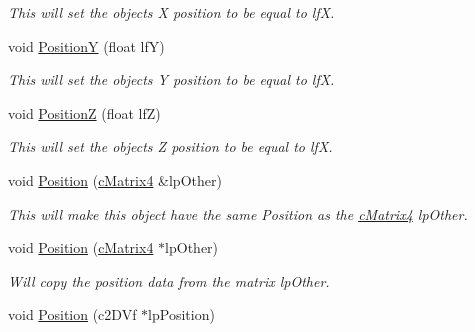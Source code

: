 \begin{DoxyCompactItemize}
\begin{DoxyCompactList}\small\item\em This will set the objects X position to be equal to lfX. \end{DoxyCompactList}\item 
\hypertarget{classc_matrix4_a4f7469486d7557e158ebc70a261c853c}{
void \hyperlink{classc_matrix4_a4f7469486d7557e158ebc70a261c853c}{PositionY} (float lfY)}
\label{classc_matrix4_a4f7469486d7557e158ebc70a261c853c}

\begin{DoxyCompactList}\small\item\em This will set the objects Y position to be equal to lfX. \end{DoxyCompactList}\item 
\hypertarget{classc_matrix4_a6baf253feb5e27b5e3e81971d9f5d718}{
void \hyperlink{classc_matrix4_a6baf253feb5e27b5e3e81971d9f5d718}{PositionZ} (float lfZ)}
\label{classc_matrix4_a6baf253feb5e27b5e3e81971d9f5d718}

\begin{DoxyCompactList}\small\item\em This will set the objects Z position to be equal to lfX. \end{DoxyCompactList}\item 
\hypertarget{classc_matrix4_a79457e17d6ab9a0c5db16c94405be35c}{
void \hyperlink{classc_matrix4_a79457e17d6ab9a0c5db16c94405be35c}{Position} (\hyperlink{classc_matrix4}{cMatrix4} \&lpOther)}
\label{classc_matrix4_a79457e17d6ab9a0c5db16c94405be35c}

\begin{DoxyCompactList}\small\item\em This will make this object have the same Position as the \hyperlink{classc_matrix4}{cMatrix4} lpOther. \end{DoxyCompactList}\item 
\hypertarget{classc_matrix4_a6e0051199566d89193d7c2e07e957eb4}{
void \hyperlink{classc_matrix4_a6e0051199566d89193d7c2e07e957eb4}{Position} (\hyperlink{classc_matrix4}{cMatrix4} $\ast$lpOther)}
\label{classc_matrix4_a6e0051199566d89193d7c2e07e957eb4}

\begin{DoxyCompactList}\small\item\em Will copy the position data from the matrix lpOther. \end{DoxyCompactList}\item 
\hypertarget{classc_matrix4_ac182a447e047d9071b035b374e8abf45}{
void \hyperlink{classc_matrix4_ac182a447e047d9071b035b374e8abf45}{Position} (c2DVf $\ast$lpPosition)}
\label{classc_matrix4_ac182a447e047d9071b035b374e8abf45}


\end{DoxyCompactItemize}
